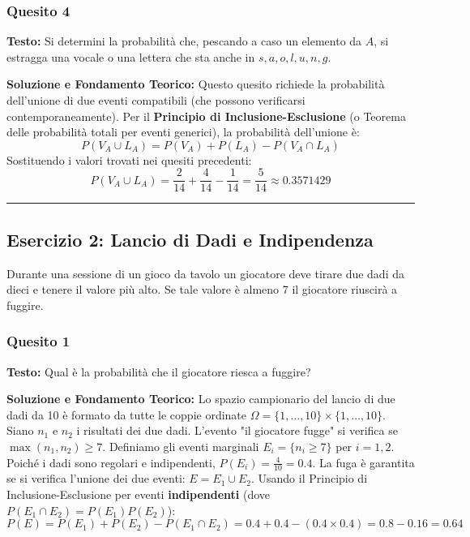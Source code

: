 \documentclass[12pt, a4paper]{article}
\begin{document}
\subsubsection*{Quesito 4}
\textbf{Testo:} Si determini la probabilità che, pescando a caso un elemento da $A$, si estragga una vocale o una lettera che sta anche in $s, a, o, l, u, n, g$.

\textbf{Soluzione e Fondamento Teorico:} 
Questo quesito richiede la probabilità dell'unione di due eventi compatibili (che possono verificarsi contemporaneamente). Per il \textbf{Principio di Inclusione-Esclusione} (o Teorema delle probabilità totali per eventi generici), la probabilità dell'unione è:
$$ P(V_A \cup L_A) = P(V_A) + P(L_A) - P(V_A \cap L_A) $$
Sostituendo i valori trovati nei quesiti precedenti:
$$ P(V_A \cup L_A) = \frac{2}{14} + \frac{4}{14} - \frac{1}{14} = \frac{5}{14} \approx 0.3571429 $$

\vspace{0.5cm}\hrule\vspace{0.5cm}

\subsection*{Esercizio 2: Lancio di Dadi e Indipendenza}
Durante una sessione di un gioco da tavolo un giocatore deve tirare due dadi da dieci e tenere il valore più alto. Se tale valore è almeno 7 il giocatore riuscirà a fuggire.

\subsubsection*{Quesito 1}
\textbf{Testo:} Qual è la probabilità che il giocatore riesca a fuggire?

\textbf{Soluzione e Fondamento Teorico:} 
Lo spazio campionario del lancio di due dadi da 10 è formato da tutte le coppie ordinate $\Omega = \{1,\dots,10\} \times \{1,\dots,10\}$.
Siano $n_1$ e $n_2$ i risultati dei due dadi. L'evento "il giocatore fugge" si verifica se $\max(n_1, n_2) \ge 7$. 
Definiamo gli eventi marginali $E_i = \{n_i \ge 7\}$ per $i=1,2$. Poiché i dadi sono regolari e indipendenti, $P(E_i) = \frac{4}{10} = 0.4$.
La fuga è garantita se si verifica l'unione dei due eventi: $E = E_1 \cup E_2$. Usando il Principio di Inclusione-Esclusione per eventi \textbf{indipendenti} (dove $P(E_1 \cap E_2) = P(E_1)P(E_2)$):
$$ P(E) = P(E_1) + P(E_2) - P(E_1 \cap E_2) = 0.4 + 0.4 - (0.4 \times 0.4) = 0.8 - 0.16 = 0.64 $$
\end{document}
